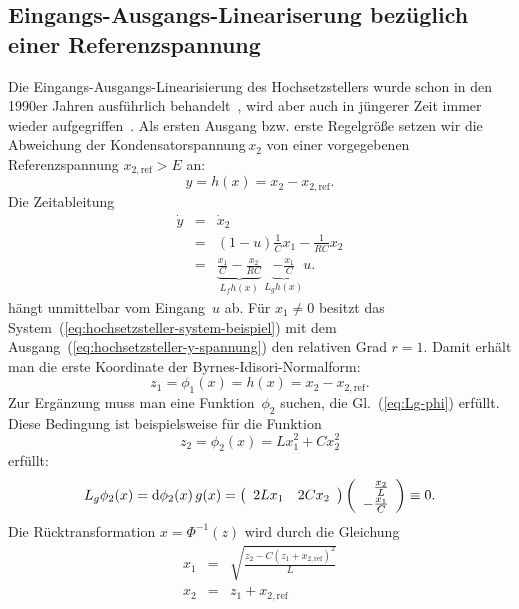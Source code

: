 \subsection{Eingangs-Ausgangs-Lineariserung bezüglich einer Referenzspannung\label{subsec:Hochsetzsteller-Ausgang-Spannung}}

Die Eingangs-Ausgangs-Linearisierung des Hochsetzstellers wurde schon
in den 1990er Jahren ausführlich behandelt~\cite{escobar1999converter},
wird aber auch in jüngerer Zeit immer wieder aufgegriffen~\cite{shuai2008,liu2010}.
Als ersten Ausgang bzw. erste Regelgröße setzen wir die Abweichung
der Kondensatorspannung\,$x_{2}$ von einer vorgegebenen Referenzspannung
$x_{2,\text{ref}}>E$ an: 
\begin{equation}
y=h(x)=x_{2}-x_{2,\text{ref}}.\label{eq:hochsetzsteller-y-spannung}
\end{equation}
Die Zeitableitung 
\begin{eqnarray*}
\dot{y} & = & \dot{x}_{2}\\
 & = & (1-u)\frac{1}{C}x_{1}-\frac{1}{RC}x_{2}\\
 & = & \underbrace{\frac{x_{1}}{C}-\frac{x_{2}}{RC}}_{{\displaystyle L_{f}h(x)}}\,\underbrace{-\frac{x_{1}}{C}}_{{\displaystyle L_{g}h(x)}}u.
\end{eqnarray*}
hängt unmittelbar vom Eingang~$u$ ab. Für $x_{1}\neq0$ besitzt
das System~(\ref{eq:hochsetzsteller-system-beispiel}) mit dem Ausgang~(\ref{eq:hochsetzsteller-y-spannung})
den relativen Grad $r=1$. Damit erhält man die erste Koordinate der
Byrnes-Idisori-Normalform: 
\[
z_{1}=\phi_{1}(x)=h(x)=x_{2}-x_{2,\text{ref}}.
\]
Zur Ergänzung muss man eine Funktion~$\phi_{2}$ suchen, die Gl.~(\ref{eq:Lg-phi})
erfüllt. Diese Bedingung ist beispielsweise für die Funktion 
\begin{equation}
z_{2}=\phi_{2}(x)=Lx_{1}^{2}+Cx_{2}^{2}\label{eq:hochsetzsteller-phi2}
\end{equation}
erfüllt: 
\[
L_{g}\phi_{2}(x)=\mathrm{d}\phi_{2}(x)\,g(x)=\left(\begin{array}{cc}
2Lx_{1} & 2Cx_{2}\end{array}\right)\left(\begin{array}{r}
\frac{x_{2}}{L}\\
-\frac{x_{1}}{C}
\end{array}\right)\equiv0.
\]
Die Rücktransformation $x=\Phi^{-1}(z)$ wird durch die Gleichung
\[
\begin{array}{lcl}
x_{1} & = & \sqrt{\frac{z_{2}-C(z_{1}+x_{2,\text{ref}})^{2}}{L}}\\
x_{2} & = & z_{1}+x_{2,\text{ref}}
\end{array}
\]
